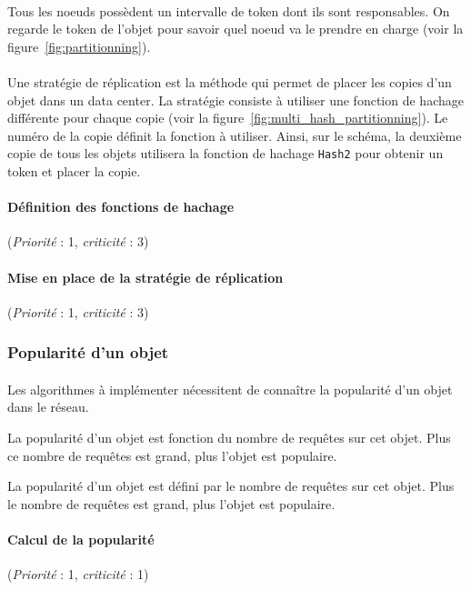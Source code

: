 \documentclass[12pt]{article}
\newcommand{\besoin}[2] {
  (\textit{Priorité} : #1, \textit{criticité} : #2)
}
\begin{document}
\paragraph{} Tous les noeuds possèdent un intervalle de token dont ils sont responsables. 
On regarde le token de l'objet pour savoir quel noeud va le prendre en charge (voir la figure~\ref{fig:partitionning}).

\paragraph{} Une stratégie de réplication est la méthode qui permet de placer les copies d'un objet dans un data center.
La stratégie consiste à utiliser une fonction de hachage différente pour chaque copie (voir la figure~\ref{fig:multi_hash_partitionning}). 
Le numéro de la copie définit la fonction à utiliser. 
Ainsi, sur le schéma, la deuxième copie de tous les objets utilisera la fonction de hachage \texttt{Hash2} pour obtenir un token et placer la copie.

\paragraph{Définition des fonctions de hachage} \besoin{1}{3}
\paragraph{Mise en place de la stratégie de réplication} \besoin{1}{3}


\subsubsection{Popularité d'un objet}

\paragraph{} Les algorithmes à implémenter nécessitent de connaître la popularité d'un objet dans le réseau.

La popularité d'un objet est fonction du nombre de requêtes sur cet objet.
Plus ce nombre de requêtes est grand, plus l'objet est populaire.

La popularité d'un objet est défini par le nombre de requêtes sur cet objet. Plus le nombre de requêtes est grand, plus l'objet est populaire.


\paragraph{Calcul de la popularité} \besoin{1}{1}
\end{document}
